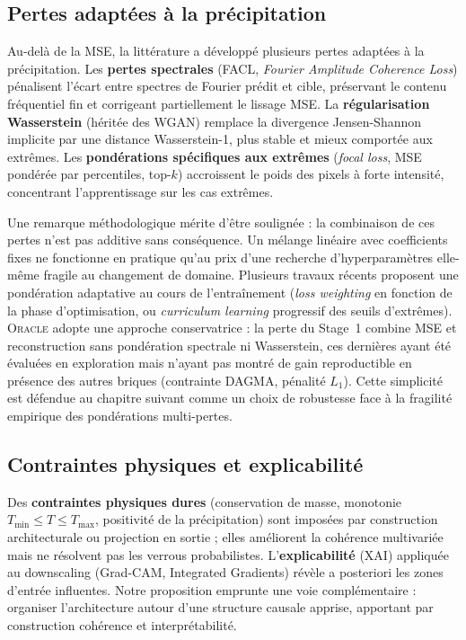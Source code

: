 \documentclass[14pt,a4paper,openany]{extreport}
\newcommand{\Oracle}{\textsc{Oracle}}
\begin{document}
\subsection{Pertes adaptées à la précipitation}
\label{ssec:soa-pertes-precip}

Au-delà de la MSE, la littérature a développé plusieurs pertes adaptées à la précipitation. Les \textbf{pertes spectrales} (FACL, \emph{Fourier Amplitude Coherence Loss}) pénalisent l'écart entre spectres de Fourier prédit et cible, préservant le contenu fréquentiel fin et corrigeant partiellement le lissage MSE. La \textbf{régularisation Wasserstein} (héritée des WGAN) remplace la divergence Jensen-Shannon implicite par une distance Wasserstein-1, plus stable et mieux comportée aux extrêmes. Les \textbf{pondérations spécifiques aux extrêmes} (\emph{focal loss}, MSE pondérée par percentiles, top-$k$) accroissent le poids des pixels à forte intensité, concentrant l'apprentissage sur les cas extrêmes.

Une remarque méthodologique mérite d'être soulignée : la combinaison de ces pertes n'est pas additive sans conséquence. Un mélange linéaire avec coefficients fixes ne fonctionne en pratique qu'au prix d'une recherche d'hyperparamètres elle-même fragile au changement de domaine. Plusieurs travaux récents proposent une pondération adaptative au cours de l'entraînement (\emph{loss weighting} en fonction de la phase d'optimisation, ou \emph{curriculum learning} progressif des seuils d'extrêmes). \Oracle{} adopte une approche conservatrice : la perte du Stage~1 combine MSE et reconstruction sans pondération spectrale ni Wasserstein, ces dernières ayant été évaluées en exploration mais n'ayant pas montré de gain reproductible en présence des autres briques (contrainte DAGMA, pénalité $L_1$). Cette simplicité est défendue au chapitre suivant comme un choix de robustesse face à la fragilité empirique des pondérations multi-pertes.

\subsection{Contraintes physiques et explicabilité}
\label{ssec:soa-physics-xai}

Des \textbf{contraintes physiques dures} (conservation de masse, monotonie $T_{\min} \leq T \leq T_{\max}$, positivité de la précipitation) sont imposées par construction architecturale ou projection en sortie ; elles améliorent la cohérence multivariée mais ne résolvent pas les verrous probabilistes. L'\textbf{explicabilité} (XAI) appliquée au downscaling (Grad-CAM, Integrated Gradients) révèle a posteriori les zones d'entrée influentes. Notre proposition emprunte une voie complémentaire : organiser l'architecture autour d'une structure causale apprise, apportant par construction cohérence et interprétabilité.
\end{document}
